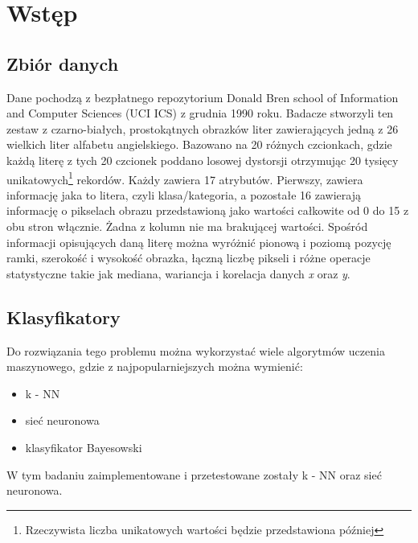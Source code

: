 \section{Wstęp}\label{sec:wstep}

\subsection{Zbiór danych}\label{subsec:zbiordanych}
Dane pochodzą z bezpłatnego repozytorium \cite{misc_letter_recognition_59} 
Donald Bren school of Information and Computer Sciences (UCI ICS) z grudnia 1990 roku.
Badacze stworzyli ten zestaw z czarno-białych, prostokątnych obrazków liter zawierających jedną z 26 wielkich liter alfabetu angielskiego.
Bazowano na 20 różnych czcionkach, gdzie każdą literę z tych 20 czcionek poddano losowej dystorsji otrzymując 20 tysięcy 
unikatowych\footnote{Rzeczywista liczba unikatowych wartości będzie przedstawiona później} rekordów.
Każdy zawiera 17 atrybutów. Pierwszy, zawiera informację jaka to litera, czyli klasa/kategoria, 
a pozostałe 16 zawierają informację o pikselach obrazu przedstawioną jako wartości całkowite od 0 do 15 z obu stron włącznie.
Żadna z kolumn nie ma brakującej wartości. Spośród informacji opisujących daną literę można wyróżnić pionową i poziomą pozycję ramki, 
szerokość i wysokość obrazka, łączną liczbę pikseli i różne operacje statystyczne
takie jak mediana, wariancja i korelacja danych \textit{x} oraz \textit{y}.

\subsection{Klasyfikatory}\label{subsec:klasyfikatory}
Do rozwiązania tego problemu można wykorzystać wiele algorytmów uczenia maszynowego, gdzie z najpopularniejszych można wymienić:
\begin{itemize}
    \item k - NN
    \item sieć neuronowa
    \item klasyfikator Bayesowski
\end{itemize}
W tym badaniu zaimplementowane i przetestowane zostały k - NN oraz sieć neuronowa.

